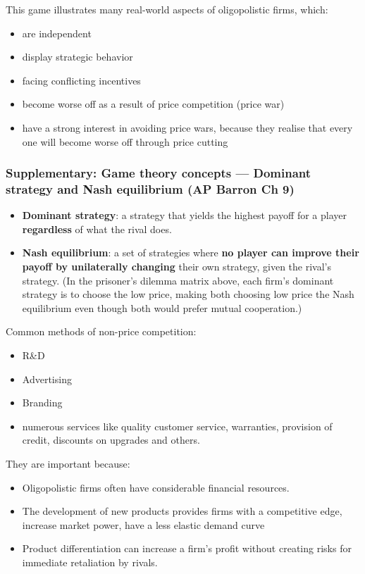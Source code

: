 \documentclass[a4paper,12pt]{article}
\newcommand{\needbold}[1]{\textcolor{red!70!black}{\textbf{#1}}}
\begin{document}
This game illustrates many real-world aspects of oligopolistic firms, which:
\begin{itemize}
  \item are independent
  \item display strategic behavior
  \item facing conflicting incentives
  \item become worse off as a result of price competition (price war)
  \item have a strong interest in avoiding price wars, because they realise that every one will become worse off through price cutting
\end{itemize}
\subsubsection*{Supplementary: Game theory concepts --- Dominant strategy and Nash equilibrium (AP Barron Ch 9)}
\begin{itemize}
  \item \needbold{Dominant strategy}: a strategy that yields the highest payoff for a player \textbf{regardless} of what the rival does.
  \item \needbold{Nash equilibrium}: a set of strategies where \textbf{no player can improve their payoff by unilaterally changing} their own strategy, given the rival's strategy. (In the prisoner's dilemma matrix above, each firm's dominant strategy is to choose the low price, making both choosing low price the Nash equilibrium even though both would prefer mutual cooperation.)
\end{itemize}
Common methods of non-price competition:
\begin{itemize}
  \item R\&D
  \item Advertising
  \item Branding
  \item numerous services like quality customer service, warranties, provision of credit, discounts on upgrades and others.
\end{itemize}
They are important because:
\begin{itemize}
  \item Oligopolistic firms often have considerable financial resources.
  \item The development of new products provides firms with a competitive edge, increase market power, have a less elastic demand curve
  \item Product differentiation can increase a firm's profit without creating risks for immediate retaliation by rivals.
\end{itemize}
\end{document}
